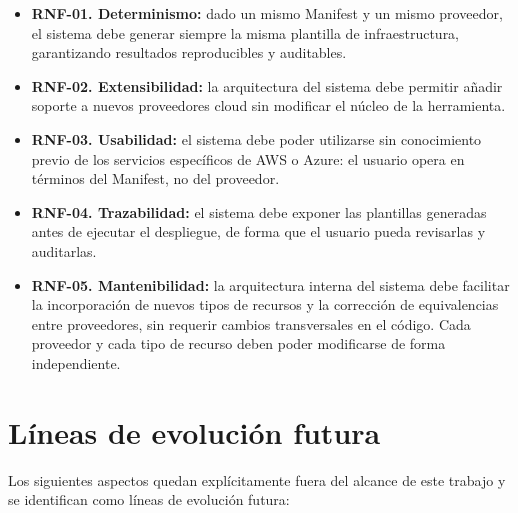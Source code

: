 \begin{itemize}
    \item \textbf{RNF-01. Determinismo:} dado un mismo Manifest y un mismo
    proveedor, el sistema debe generar siempre la misma plantilla de
    infraestructura, garantizando resultados reproducibles y auditables.

    \item \textbf{RNF-02. Extensibilidad:} la arquitectura del sistema debe
    permitir añadir soporte a nuevos proveedores cloud sin modificar el núcleo
    de la herramienta.

    \item \textbf{RNF-03. Usabilidad:} el sistema debe poder utilizarse sin
    conocimiento previo de los servicios específicos de AWS o Azure: el usuario
    opera en términos del Manifest, no del proveedor.

    \item \textbf{RNF-04. Trazabilidad:} el sistema debe exponer las plantillas
    generadas antes de ejecutar el despliegue, de forma que el usuario pueda
    revisarlas y auditarlas.

    \item \textbf{RNF-05. Mantenibilidad:} la arquitectura interna del sistema
    debe facilitar la incorporación de nuevos tipos de recursos y la corrección
    de equivalencias entre proveedores, sin requerir cambios transversales en el
    código. Cada proveedor y cada tipo de recurso deben poder modificarse de forma
    independiente.
\end{itemize}

\section{Líneas de evolución futura}

Los siguientes aspectos quedan explícitamente fuera del alcance de este trabajo
y se identifican como líneas de evolución futura:

